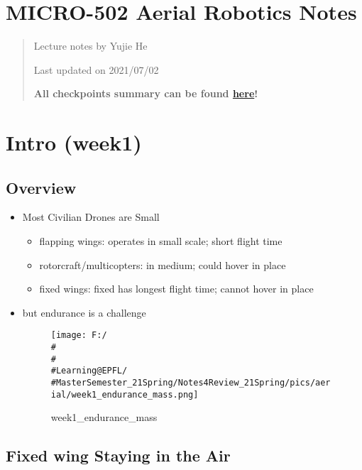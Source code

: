 \documentclass[]{article}
\date{}
\begin{document}
\tableofcontents

\section{\texorpdfstring{MICRO-502 Aerial Robotics Notes}{MICRO-502 Aerial Robotics Notes}}\label{header-n2}

\begin{quote}
Lecture notes by Yujie He

Last updated on 2021/07/02

\textbf{All checkpoints summary can be found
\href{https://go.epfl.ch/aerial-rob-2021}{here}!}
\end{quote}

\section{Intro (week1)}\label{header-n7}

\subsection{Overview}\label{header-n8}

\begin{itemize}
\item
  Most Civilian Drones are Small

  \begin{itemize}
  \item
    flapping wings: operates in small scale; short flight time
  \item
    rotorcraft/multicopters: in medium; could hover in place
  \item
    fixed wings: fixed has longest flight time; cannot hover in place
  \end{itemize}
\item
  but endurance is a challenge

  \begin{figure}
  \centering
  \texttt{[image: F:/\\\#\\\#\\\#Learning@EPFL/\\\#MasterSemester\_21Spring/Notes4Review\_21Spring/pics/aerial/week1\_endurance\_mass.png]}
  \caption{week1\_endurance\_mass}
  \end{figure}
\end{itemize}

\subsection{Fixed wing Staying in the Air}\label{header-n22}
\end{document}
